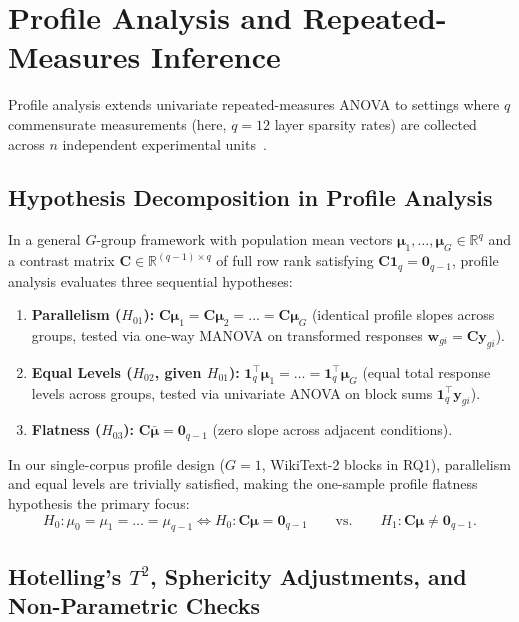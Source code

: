 \documentclass[12pt, a4paper, oneside]{report}
\theoremstyle{definition}
\newcommand{\vect}[1]{\mathbf{#1}}
\newcommand{\mat}[1]{\mathbf{#1}}
\newcommand{\R}{\mathbb{R}}
\begin{document}
\section{Profile Analysis and Repeated-Measures Inference}

Profile analysis extends univariate repeated-measures ANOVA to settings where $q$ commensurate measurements (here, $q = 12$ layer sparsity rates) are collected across $n$ independent experimental units~\cite{johnson2014applied, anderson2003introduction}.

\subsection{Hypothesis Decomposition in Profile Analysis}

In a general $G$-group framework with population mean vectors $\boldsymbol{\mu}_1, \dots, \boldsymbol{\mu}_G \in \R^q$ and a contrast matrix $\mat{C} \in \R^{(q-1) \times q}$ of full row rank satisfying $\mat{C}\vect{1}_q = \vect{0}_{q-1}$, profile analysis evaluates three sequential hypotheses:
\begin{enumerate}
    \item \textbf{Parallelism ($H_{01}$):} $\mat{C}\boldsymbol{\mu}_1 = \mat{C}\boldsymbol{\mu}_2 = \dots = \mat{C}\boldsymbol{\mu}_G$ (identical profile slopes across groups, tested via one-way MANOVA on transformed responses $\vect{w}_{gi} = \mat{C}\vect{y}_{gi}$).
    \item \textbf{Equal Levels ($H_{02}$, given $H_{01}$):} $\vect{1}_q^\top \boldsymbol{\mu}_1 = \dots = \vect{1}_q^\top \boldsymbol{\mu}_G$ (equal total response levels across groups, tested via univariate ANOVA on block sums $\vect{1}_q^\top \vect{y}_{gi}$).
    \item \textbf{Flatness ($H_{03}$):} $\mat{C}\bar{\boldsymbol{\mu}} = \vect{0}_{q-1}$ (zero slope across adjacent conditions).
\end{enumerate}
In our single-corpus profile design ($G = 1$, WikiText-2 blocks in RQ1), parallelism and equal levels are trivially satisfied, making the one-sample profile flatness hypothesis the primary focus:
\begin{equation}
    H_0 : \mu_0 = \mu_1 = \dots = \mu_{q-1} \iff H_0 : \mat{C}\boldsymbol{\mu} = \vect{0}_{q-1}
    \qquad \text{vs.} \qquad
    H_1 : \mat{C}\boldsymbol{\mu} \neq \vect{0}_{q-1}.
    \label{eq:rq1_flatness_hyp}
\end{equation}

\subsection{Hotelling's \texorpdfstring{$T^2$}{T2}, Sphericity Adjustments, and Non-Parametric Checks}
\end{document}
